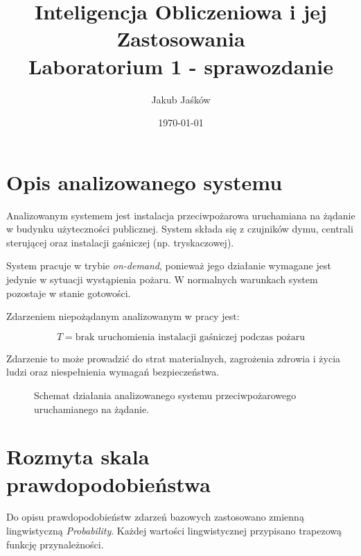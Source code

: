\documentclass[11pt,a4paper]{article}
\title{Inteligencja Obliczeniowa i jej Zastosowania \\ Laboratorium 1 - sprawozdanie}
\author{Jakub Jaśków}
\date{\today}
\begin{document}
\maketitle

\section{Opis analizowanego systemu}

Analizowanym systemem jest instalacja przeciwpożarowa uruchamiana na żądanie w budynku użyteczności publicznej. System składa się z czujników dymu, centrali sterującej oraz instalacji gaśniczej (np. tryskaczowej).

System pracuje w trybie \textit{on-demand}, ponieważ jego działanie wymagane jest jedynie w sytuacji wystąpienia pożaru. W normalnych warunkach system pozostaje w stanie gotowości.

Zdarzeniem niepożądanym analizowanym w pracy jest:

\[
T = \text{brak uruchomienia instalacji gaśniczej podczas pożaru}
\]

Zdarzenie to może prowadzić do strat materialnych, zagrożenia zdrowia i życia ludzi oraz niespełnienia wymagań bezpieczeństwa.

\begin{figure}[H]
\centering
{}
\caption{Schemat działania analizowanego systemu przeciwpożarowego uruchamianego na żądanie.}
\label{fig:system}
\end{figure}

\section{Rozmyta skala prawdopodobieństwa}

Do opisu prawdopodobieństw zdarzeń bazowych zastosowano zmienną lingwistyczną \textit{Probability}. Każdej wartości lingwistycznej przypisano trapezową funkcję przynależności.
\end{document}
